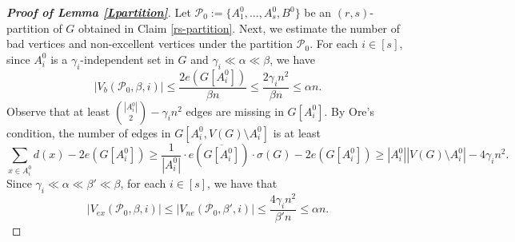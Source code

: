 \documentclass[11pt, a4paper]{article}
\newtheorem{claim}[theorem]{Claim}
\theoremstyle{definition}
\newcommand{\<}{\subseteq}
\begin{document}
\begin{proof}[\bf Proof of Lemma \ref{Lpartition}]




Let $\mathcal{P}_0:=\{A_1^0,\dots,A_s^0,B^0\}$ be an $(r,s)$-partition of $G$ obtained in Claim \ref{rs-partition}. Next, we estimate the number of bad vertices and non-excellent vertices under the partition $\mathcal{P}_0$. For each $i\in [s]$, since $A_i^0$ is a $\gamma_i$-independent set in $G$ and $\gamma_i\ll \alpha \ll \beta$, we have 
$$|V_b(\mathcal{P}_0,\beta,i)|\le\frac{2e(G[A_i^0])}{\beta n} \le  \frac{2\gamma_i n^2}{\beta n}\le \alpha n.$$ Observe that at least $\binom{|A_i^0|}{2}-\gamma_i n^2$ edges are missing in  $G[A_i^0]$. By Ore's condition, the number of edges in $G[A_i^0,V(G)\setminus A_i^0]$ is at least
$$\underset{x\in A_i^0}{\sum}d(x)-2e(G[A_i^0])\ge 
\frac{1}{|A_i^0|} \cdot
e\left (\overline{G[A_i^0]}\right )\cdot\sigma (G)-2 e\left(G[A_i^0]\right) \ge |A_i^0||V(G)\setminus A_i^0|-4\gamma_i n^2.
$$
Since $\gamma_i \ll \alpha \ll \beta' \ll \beta$, for each $i\in [s]$, we have that 
$$|V_{ex}(\mathcal{P}_0,\beta,i)|\leq |V_{ne}(\mathcal{P}_0,\beta',i)|\le \frac{4\gamma_i n^2}{\beta'n}\leq  \alpha n.$$ %





\end{proof}
\end{document}
